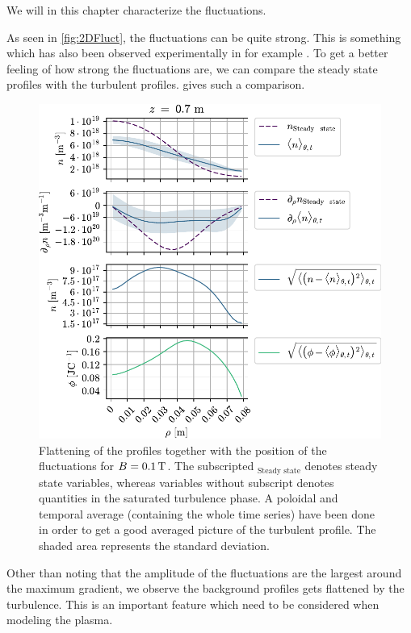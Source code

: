 We will in this chapter characterize the fluctuations.

As seen in \cref{fig:2DFluct}, the fluctuations can be quite strong.
This is something which has also been observed experimentally in for example \cite{Burin2005}.
To get a better feeling of how strong the fluctuations are, we can compare the steady state profiles with the turbulent profiles.
 gives such a comparison.
%
\begin{figure}[h!]
    \begin{center}
        \includegraphics{fig/results/posOfFluct/posOfFluctB01}
    \end{center}
    \caption{Flattening of the profiles together with the position of the fluctuations for $B=0.1\, \text{T}$.
        The subscripted $_\text{Steady state}$ denotes steady state variables, whereas variables without subscript denotes quantities in the saturated turbulence phase.
        A poloidal and temporal average (containing the whole time series) have been done in order to get a good averaged picture of the turbulent profile.
        The shaded area represents the standard deviation.
    }
    \label{fig:posOfFluct01}
\end{figure}
%
Other than noting that the amplitude of the fluctuations are the largest around the maximum gradient, we observe the background profiles gets flattened by the turbulence.
This is an important feature which need to be considered when modeling the plasma.

